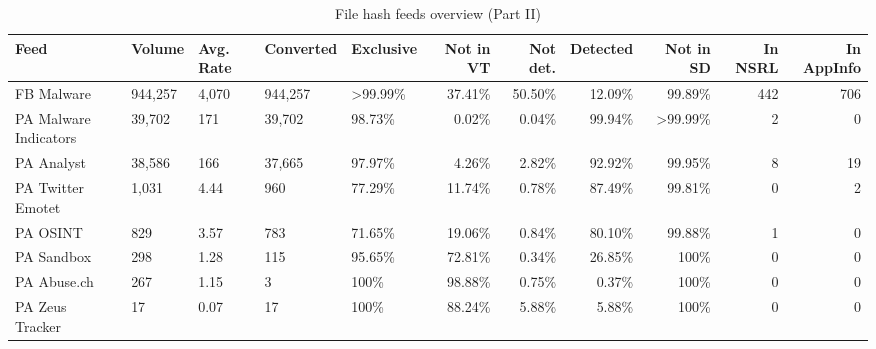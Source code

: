 \begin{table*}[htt]
\footnotesize \tabcolsep=0.11cm
\caption{File hash feeds overview (Part II)}
\centering
\small
\begin{tabular}{l H H H H | r r r | r r r }
\toprule
 Feed         &   Volume  &  Avg. Rate  & Converted &   Exclusive  &   Not in VT    &  Not det.  &   Detected   &   Not in SD &   In NSRL   &  In AppInfo  \\
\midrule
 FB Malware              &    944,257  &  4,070    & 944,257   &    >99.99\%    &     37.41\%    &    50.50\%      &     12.09\%          &    99.89\% &     442 &             706 \\
 PA Malware Indicators   &    39,702   &  171      & 39,702    &     98.73\%    &      0.02\%    &     0.04\%      &     99.94\%          &   >99.99\% &       2 &             0  \\
 PA Analyst              &    38,586   &  166      & 37,665    &     97.97\%    &      4.26\%    &     2.82\%      &     92.92\%          &    99.95\% &       8 &             19 \\
 PA Twitter Emotet       &    1,031    &  4.44     & 960       &     77.29\%    &     11.74\%    &     0.78\%      &     87.49\%          &    99.81\% &       0 &             2  \\
 PA OSINT                &    829      &  3.57     & 783       &     71.65\%    &     19.06\%    &     0.84\%      &     80.10\%          &    99.88\% &       1 &             0  \\
 PA Sandbox              &    298      &  1.28     & 115       &     95.65\%    &     72.81\%    &     0.34\%      &     26.85\%          &    100\% &         0 &             0  \\
 PA Abuse.ch             &    267      &  1.15     & 3         &       100\%    &     98.88\%    &     0.75\%      &      0.37\%          &    100\% &         0 &             0  \\
 PA Zeus Tracker         &    17       &  0.07     & 17        &       100\%    &     88.24\%    &     5.88\%      &      5.88\%          &    100\% &         0 &             0  \\
\bottomrule
\end{tabular}
\label{tab:md5-volume-2}
\end{table*}



%

